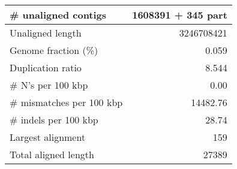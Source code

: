\documentclass[12pt,a4paper]{article}
\begin{document}
\begin{table}[ht]
\begin{center}
\begin{tabular}{|l*{1}{|r}|}
\# unaligned contigs & 1608391 + 345 part \\ \hline
Unaligned length & 3246708421 \\ \hline
Genome fraction (\%) & 0.059 \\ \hline
Duplication ratio & 8.544 \\ \hline
\# N's per 100 kbp & 0.00 \\ \hline
\# mismatches per 100 kbp & 14482.76 \\ \hline
\# indels per 100 kbp & 28.74 \\ \hline
Largest alignment & 159 \\ \hline
Total aligned length & 27389 \\ \hline
\end{tabular}
\end{center}
\end{table}
\end{document}
